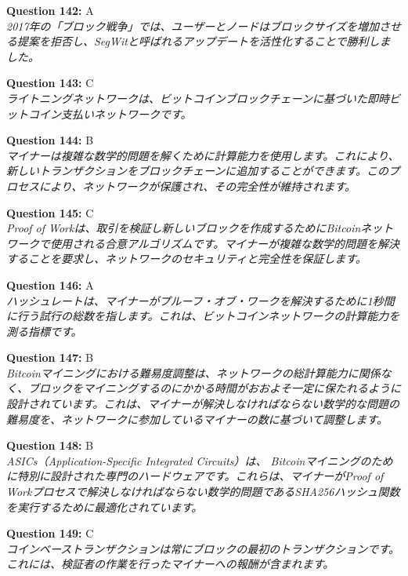 \documentclass[12pt,a4paper]{article}
\begin{document}
\begin{enumerate}
{{{{{{{{\item \textbf{Question 142:} A
\\ \textit{2017年の「ブロック戦争」では、ユーザーとノードはブロックサイズを増加させる提案を拒否し、SegWitと呼ばれるアップデートを活性化することで勝利しました。}

\item \textbf{Question 143:} C
\\ \textit{ライトニングネットワークは、ビットコインブロックチェーンに基づいた即時ビットコイン支払いネットワークです。}

\item \textbf{Question 144:} B
\\ \textit{マイナーは複雑な数学的問題を解くために計算能力を使用します。これにより、新しいトランザクションをブロックチェーンに追加することができます。このプロセスにより、ネットワークが保護され、その完全性が維持されます。}

\item \textbf{Question 145:} C
\\ \textit{Proof of Workは、取引を検証し新しいブロックを作成するためにBitcoinネットワークで使用される合意アルゴリズムです。マイナーが複雑な数学的問題を解決することを要求し、ネットワークのセキュリティと完全性を保証します。}

\item \textbf{Question 146:} A
\\ \textit{ハッシュレートは、マイナーがプルーフ・オブ・ワークを解決するために1秒間に行う試行の総数を指します。これは、ビットコインネットワークの計算能力を測る指標です。}

\item \textbf{Question 147:} B
\\ \textit{Bitcoinマイニングにおける難易度調整は、ネットワークの総計算能力に関係なく、ブロックをマイニングするのにかかる時間がおおよそ一定に保たれるように設計されています。これは、マイナーが解決しなければならない数学的な問題の難易度を、ネットワークに参加しているマイナーの数に基づいて調整します。}

\item \textbf{Question 148:} B
\\ \textit{ASICs（Application-Specific Integrated Circuits）は、
Bitcoinマイニングのために特別に設計された専門のハードウェアです。これらは、マイナーがProof of Workプロセスで解決しなければならない数学的問題であるSHA256ハッシュ関数を実行するために最適化されています。}

\item \textbf{Question 149:} C
\\ \textit{コインベーストランザクションは常にブロックの最初のトランザクションです。これには、検証者の作業を行ったマイナーへの報酬が含まれます。}

}}}}}}}}
\end{enumerate}
\end{document}
